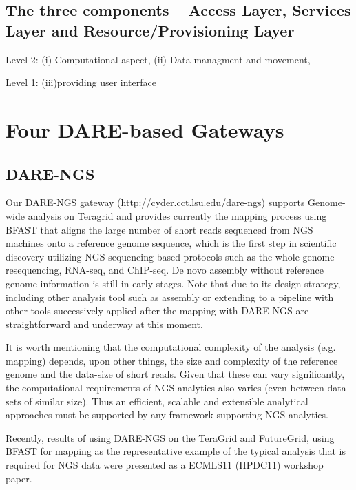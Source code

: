 \documentclass[12pt]{article}
\begin{document}
\subsection{The three components -- Access Layer, Services Layer and
  Resource/Provisioning Layer} 

Level 2: (i) Computational aspect, (ii) Data managment and movement, 

Level 1: (iii)providing user interface

\section{Four DARE-based Gateways}
\subsection{DARE-NGS}
Our DARE-NGS gateway (http://cyder.cct.lsu.edu/dare-ngs) supports Genome-wide analysis on Teragrid and provides currently the mapping process using BFAST that aligns the large number of short reads sequenced from NGS machines onto a reference genome sequence, which is the first step in scientific discovery utilizing NGS sequencing-based protocols such as the whole genome resequencing, RNA-seq, and ChIP-seq.  De novo assembly without reference genome information is still in early stages.  Note that due to its design strategy, including other analysis tool such as assembly or extending to a pipeline with other tools successively applied after the mapping with DARE-NGS are straightforward and underway at this moment.

It is worth mentioning that the computational complexity
of the analysis (e.g. mapping) depends, upon other things, the size
and complexity of the reference genome and the data-size of short reads.
Given that these can vary significantly, the computational
requirements of NGS-analytics also varies (even between data-sets of
similar size).  Thus an efficient, scalable and extensible analytical
approaches must be supported by any framework supporting
NGS-analytics.

Recently, results of using DARE-NGS on the TeraGrid and
FutureGrid, using BFAST for mapping as the representative example of
the typical analysis that is required for NGS data were presented as a ECMLS11 (HPDC11) workshop paper.  
\end{document}
